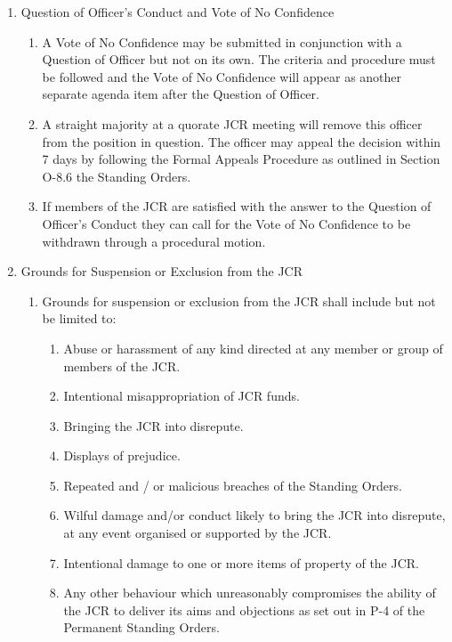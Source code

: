 \begin{enumerate}
\begin{enumerate}
    \end{enumerate}
    \item Question of Officer's Conduct and Vote of No Confidence
    \begin{enumerate}
        \item A Vote of No Confidence may be submitted in conjunction with a Question of Officer but not on its own. The criteria and procedure must be followed and the Vote of No Confidence will appear as another separate agenda item after the Question of Officer.
        \item A straight majority at a quorate JCR meeting will remove this officer from the position in question. The officer may appeal the decision within 7 days by following the Formal Appeals Procedure as outlined in Section O-8.6 the Standing Orders.
        \item If members of the JCR are satisfied with the answer to the Question of Officer’s Conduct they can call for the Vote of No Confidence to be withdrawn through a procedural motion.
    \end{enumerate}
    \item Grounds for Suspension or Exclusion from the JCR
    \begin{enumerate}
        \item Grounds for suspension or exclusion from the JCR shall include but not be limited to:
        \begin{enumerate}
            \item Abuse or harassment of any kind directed at any member or group of members of the JCR.
            \item Intentional misappropriation of JCR funds.
            \item Bringing the JCR into disrepute.
            \item Displays of prejudice.
            \item Repeated and / or malicious breaches of the Standing Orders.
            \item Wilful damage and/or conduct likely to bring the JCR into disrepute, at any event organised or supported by the JCR.
            \item Intentional damage to one or more items of property of the JCR.
            \item Any other behaviour which unreasonably compromises the ability of the JCR to deliver its
            aims and objections as set out in P-4 of the Permanent Standing Orders.
        \end{enumerate}

\end{enumerate}
\end{enumerate}

